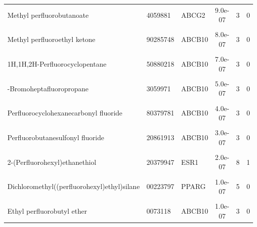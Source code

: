 \documentclass[11pt]{article}
\begin{document}
\begin{table}[htbp]
{\begin{tabular}[t]{lllccc}
Methyl perfluorobutanoate & 4059881 & ABCG2 & 9.0e-07 & 3 & 0\\
\addlinespace
\cellcolor{gray!10}{1-Propenylperfluoropropane} & \cellcolor{gray!10}{70379270} & \cellcolor{gray!10}{ABCB10} & \cellcolor{gray!10}{8.0e-07} & \cellcolor{gray!10}{3} & \cellcolor{gray!10}{0}\\
Methyl perfluoroethyl ketone & 90285748 & ABCB10 & 8.0e-07 & 3 & 0\\
\cellcolor{gray!10}{2-(Perfluorooctyl)ethanthiol} & \cellcolor{gray!10}{20337446} & \cellcolor{gray!10}{ABCB10} & \cellcolor{gray!10}{7.0e-07} & \cellcolor{gray!10}{3} & \cellcolor{gray!10}{0}\\
1H,1H,2H-Perfluorocyclopentane & 50880218 & ABCB10 & 7.0e-07 & 3 & 0\\
\cellcolor{gray!10}{1H,1H-Perfluoroheptylamine} & \cellcolor{gray!10}{10379835} & \cellcolor{gray!10}{ABCB10} & \cellcolor{gray!10}{6.0e-07} & \cellcolor{gray!10}{4} & \cellcolor{gray!10}{0}\\
\addlinespace
1-Bromoheptafluoropropane & 3059971 & ABCB10 & 5.0e-07 & 3 & 0\\
\cellcolor{gray!10}{Hexafluoroamylene glycol} & \cellcolor{gray!10}{3059927} & \cellcolor{gray!10}{ABCB10} & \cellcolor{gray!10}{5.0e-07} & \cellcolor{gray!10}{3} & \cellcolor{gray!10}{0}\\
Perfluorocyclohexanecarbonyl fluoride & 80379781 & ABCB10 & 4.0e-07 & 3 & 0\\
\cellcolor{gray!10}{3-(Perfluorohexyl)-1,2-epoxypropane} & \cellcolor{gray!10}{30880413} & \cellcolor{gray!10}{PPARG} & \cellcolor{gray!10}{3.0e-07} & \cellcolor{gray!10}{8} & \cellcolor{gray!10}{1}\\
Perfluorobutanesulfonyl fluoride & 20861913 & ABCB10 & 3.0e-07 & 3 & 0\\
\addlinespace
\cellcolor{gray!10}{Trichloro((perfluorohexyl)ethyl)silane} & \cellcolor{gray!10}{50229163} & \cellcolor{gray!10}{ABCB10} & \cellcolor{gray!10}{3.0e-07} & \cellcolor{gray!10}{3} & \cellcolor{gray!10}{0}\\
2-(Perfluorohexyl)ethanethiol & 20379947 & ESR1 & 2.0e-07 & 8 & 1\\
\cellcolor{gray!10}{2-(Perfluorohexyl)ethylphosphonic acid} & \cellcolor{gray!10}{20179883} & \cellcolor{gray!10}{ABCG2} & \cellcolor{gray!10}{2.0e-07} & \cellcolor{gray!10}{3} & \cellcolor{gray!10}{0}\\
Dichloromethyl((perfluorohexyl)ethyl)silane & 00223797 & PPARG & 1.0e-07 & 5 & 0\\
\cellcolor{gray!10}{3,3,4,4,5,5,6,6,6-Nonafluorohexene} & \cellcolor{gray!10}{6047575} & \cellcolor{gray!10}{ABCB10} & \cellcolor{gray!10}{1.0e-07} & \cellcolor{gray!10}{3} & \cellcolor{gray!10}{0}\\
\addlinespace
Ethyl perfluorobutyl ether & 0073118 & ABCB10 & 1.0e-07 & 3 & 0\\
\bottomrule
\end{tabular}
}
\end{table}
\end{document}
